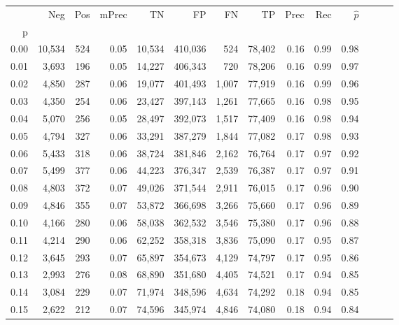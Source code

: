 \begin{tabular}{rrrrrrrrrrrrrr}
\toprule
{} &     Neg &    Pos & mPrec &       TN &       FP &      FN &      TP &  Prec &   Rec & $\hat{p}$ \\
p    &         &        &       &          &          &         &         &       &       &           \\
\midrule
0.00 &  10,534 &    524 &  0.05 &   10,534 &  410,036 &     524 &  78,402 &  0.16 &  0.99 &      0.98 \\
0.01 &   3,693 &    196 &  0.05 &   14,227 &  406,343 &     720 &  78,206 &  0.16 &  0.99 &      0.97 \\
0.02 &   4,850 &    287 &  0.06 &   19,077 &  401,493 &   1,007 &  77,919 &  0.16 &  0.99 &      0.96 \\
0.03 &   4,350 &    254 &  0.06 &   23,427 &  397,143 &   1,261 &  77,665 &  0.16 &  0.98 &      0.95 \\
0.04 &   5,070 &    256 &  0.05 &   28,497 &  392,073 &   1,517 &  77,409 &  0.16 &  0.98 &      0.94 \\
0.05 &   4,794 &    327 &  0.06 &   33,291 &  387,279 &   1,844 &  77,082 &  0.17 &  0.98 &      0.93 \\
0.06 &   5,433 &    318 &  0.06 &   38,724 &  381,846 &   2,162 &  76,764 &  0.17 &  0.97 &      0.92 \\
0.07 &   5,499 &    377 &  0.06 &   44,223 &  376,347 &   2,539 &  76,387 &  0.17 &  0.97 &      0.91 \\
0.08 &   4,803 &    372 &  0.07 &   49,026 &  371,544 &   2,911 &  76,015 &  0.17 &  0.96 &      0.90 \\
0.09 &   4,846 &    355 &  0.07 &   53,872 &  366,698 &   3,266 &  75,660 &  0.17 &  0.96 &      0.89 \\
0.10 &   4,166 &    280 &  0.06 &   58,038 &  362,532 &   3,546 &  75,380 &  0.17 &  0.96 &      0.88 \\
0.11 &   4,214 &    290 &  0.06 &   62,252 &  358,318 &   3,836 &  75,090 &  0.17 &  0.95 &      0.87 \\
0.12 &   3,645 &    293 &  0.07 &   65,897 &  354,673 &   4,129 &  74,797 &  0.17 &  0.95 &      0.86 \\
0.13 &   2,993 &    276 &  0.08 &   68,890 &  351,680 &   4,405 &  74,521 &  0.17 &  0.94 &      0.85 \\
0.14 &   3,084 &    229 &  0.07 &   71,974 &  348,596 &   4,634 &  74,292 &  0.18 &  0.94 &      0.85 \\
0.15 &   2,622 &    212 &  0.07 &   74,596 &  345,974 &   4,846 &  74,080 &  0.18 &  0.94 &      0.84 \\

\end{tabular}
